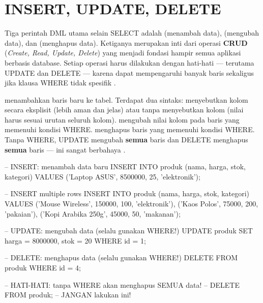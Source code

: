 \section{INSERT, UPDATE, DELETE}

Tiga perintah DML utama selain SELECT adalah  (menambah data),  (mengubah data), dan  (menghapus data). Ketiganya merupakan inti dari operasi \textbf{CRUD} (\textit{Create, Read, Update, Delete}) yang menjadi fondasi hampir semua aplikasi berbasis database. Setiap operasi harus dilakukan dengan hati-hati --- terutama UPDATE dan DELETE --- karena dapat mempengaruhi banyak baris sekaligus jika klausa WHERE tidak spesifik \cite{mysqlDocs}.

 menambahkan baris baru ke tabel. Terdapat dua sintaks: menyebutkan kolom secara eksplisit (lebih aman dan jelas) atau tanpa menyebutkan kolom (nilai harus sesuai urutan seluruh kolom).  mengubah nilai kolom pada baris yang memenuhi kondisi WHERE.  menghapus baris yang memenuhi kondisi WHERE. Tanpa WHERE, UPDATE mengubah \textbf{semua} baris dan DELETE menghapus \textbf{semua} baris --- ini sangat berbahaya \cite{mysqlGettingStarted}.

\begin{webcode}[language=SQL, caption={INSERT, UPDATE, dan DELETE}]
-- INSERT: menambah data baru
INSERT INTO produk (nama, harga, stok, kategori)
  VALUES ('Laptop ASUS', 8500000, 25, 'elektronik');

-- INSERT multiple rows
INSERT INTO produk (nama, harga, stok, kategori) VALUES
  ('Mouse Wireless', 150000, 100, 'elektronik'),
  ('Kaos Polos', 75000, 200, 'pakaian'),
  ('Kopi Arabika 250g', 45000, 50, 'makanan');

-- UPDATE: mengubah data (selalu gunakan WHERE!)
UPDATE produk SET harga = 8000000, stok = 20
  WHERE id = 1;

-- DELETE: menghapus data (selalu gunakan WHERE!)
DELETE FROM produk WHERE id = 4;

-- HATI-HATI: tanpa WHERE akan menghapus SEMUA data!
-- DELETE FROM produk;  -- JANGAN lakukan ini!
\end{webcode}

